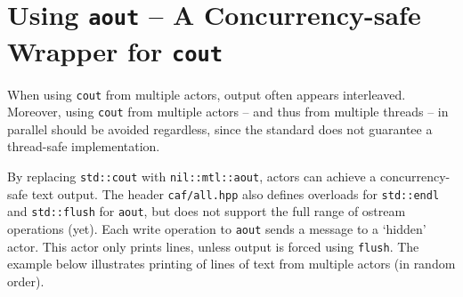 \section{Using \texttt{aout} -- A Concurrency-safe Wrapper for \texttt{cout}}

When using \lstinline^cout^ from multiple actors, output often appears
interleaved. Moreover, using \lstinline^cout^ from multiple actors -- and thus
from multiple threads -- in parallel should be avoided regardless, since the
standard does not guarantee a thread-safe implementation.

By replacing \texttt{std::cout} with \texttt{nil::mtl::aout}, actors can achieve a
concurrency-safe text output. The header \lstinline^caf/all.hpp^ also defines
overloads for \texttt{std::endl} and \texttt{std::flush} for \lstinline^aout^,
but does not support the full range of ostream operations (yet). Each write
operation to \texttt{aout} sends a message to a `hidden' actor. This actor only
prints lines, unless output is forced using \lstinline^flush^. The example
below illustrates printing of lines of text from multiple actors (in random
order).

